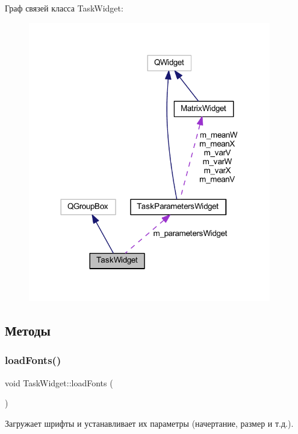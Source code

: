 Граф связей класса Task\+Widget\+:\nopagebreak
\begin{figure}[H]
\begin{center}
\leavevmode
\includegraphics[width=300pt]{class_task_widget__coll__graph}
\end{center}
\end{figure}


\subsection{Методы}
\hypertarget{class_task_widget_a941ea41fcf94ff21f2b28e1ad61c8f02}{}\label{class_task_widget_a941ea41fcf94ff21f2b28e1ad61c8f02} 
\subsubsection{\texorpdfstring{load\+Fonts()}{loadFonts()}}
{\footnotesize\ttfamily void Task\+Widget\+::load\+Fonts (\begin{DoxyParamCaption}{ }\end{DoxyParamCaption})\hspace{0.3cm}{\ttfamily [private]}}



Загружает шрифты и устанавливает их параметры (начертание, размер и т.\+д.). 

